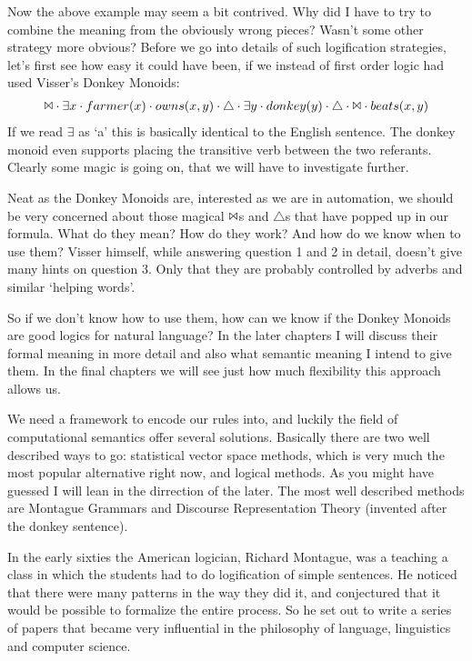 \documentclass[12pt]{article}
\begin{document}
Now the above example may seem a bit contrived. Why did I have to try to combine the meaning from the obviously wrong pieces? Wasn't some other strategy more obvious? Before we go into details of such logification strategies, let's first see how easy it could have been, if we instead of first order logic had used Visser's Donkey Monoids:
%
\begin{align}
\Bowtie \cdot \exists x \cdot farmer(x) \cdot owns(x,y) \cdot\triangle\cdot\exists y \cdot donkey(y) \cdot\triangle\cdot\Bowtie\cdot beats(x,y)
\end{align}
%
If we read $\exists$ as `a' this is basically identical to the English sentence. The donkey monoid even supports placing the transitive verb between the two referants. Clearly some magic is going on, that we will have to investigate further.

Neat as the Donkey Monoids are, interested as we are in automation, we should be very concerned about those magical $\Bowtie$s and $\triangle$s that have popped up in our formula. What do they mean? How do they work? And how do we know when to use them? Visser himself, while answering question 1 and 2 in detail, doesn't give many hints on question 3. Only that they are probably controlled by adverbs and similar `helping words'.

So if we don't know how to use them, how can we know if the Donkey Monoids are good logics for natural language? In the later chapters I will discuss their formal meaning in more detail and also what semantic meaning I intend to give them. In the final chapters we will see just how much flexibility this approach allows us.

We need a framework to encode our rules into, and luckily the field of computational semantics offer several solutions. Basically there are two well described ways to go: statistical vector space methods, which is very much the most popular alternative right now, and logical methods. As you might have guessed I will lean in the dirrection of the later. The most well described methods are Montague Grammars and Discourse Representation Theory (invented after the donkey sentence).

In the early sixties the American logician, Richard Montague, was a teaching a class in which the students had to do logification of simple sentences. He noticed that there were many patterns in the way they did it, and conjectured that it would be possible to formalize the entire process. So he set out to write a series of papers that became very influential in the philosophy of language, linguistics and computer science.
\end{document}

